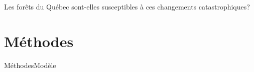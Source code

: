 \documentclass[10pt,aspectratio=149]{beamer}
\begin{document}

   \begin{frame}
      \begin{center}
         \alert{\large{Les forêts du Québec sont-elles susceptibles à ces changements catastrophiques?}}\\
      \end{center}         
   \end{frame}




\section{Méthodes}

   \begin{frame}{Méthodes}{Modèle}
      \begin{figure}
         \small{}
      \end{figure}
   \end{frame}

 
\end{document}
